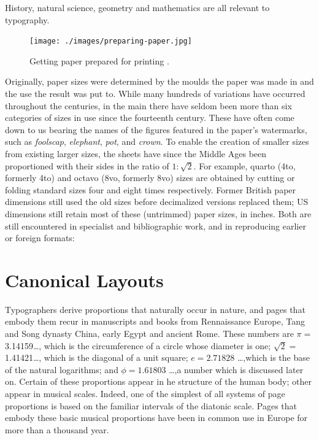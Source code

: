 History, natural science, geometry and mathematics are all relevant to typography.


\begin{figure}[ht]
\centering
\texttt{[image: ./images/preparing-paper.jpg]}
\caption{Getting paper prepared for printing \protect\cite{moxon}.}
\end{figure}

Originally, paper sizes were determined by the moulds the paper was
made in and the use the result was put to. While many hundreds of variations have occurred throughout the centuries, in the main there have seldom been more than six categories of sizes in use since the fourteenth century. These have often come down to us bearing the names of the figures featured in the paper's watermarks, such as \emph{foolscap},
\emph{elephant}, \emph{pot}, and \emph{crown}. To enable the creation of smaller sizes from
existing larger sizes, the sheets have since the Middle Ages been proportioned
with their sides in the ratio of \(1:\sqrt{2}\). For example, quarto (4to,
formerly 4to) and octavo (8vo, formerly 8vo) sizes are obtained by cutting
or folding standard sizes four and eight times respectively.
Former British paper dimensions still used the old sizes before decimalized
versions replaced them; US dimensions still retain most of these
(untrimmed) paper sizes, in inches. Both are still encountered in specialist and bibliographic work, and in reproducing earlier or foreign formats:


\section{Canonical Layouts}

Typographers derive proportions that naturally occur in nature, and pages that embody
them recur in manuscripts and books from Rennaissance Europe, Tang and Song dynasty
China, early Egypt and ancient Rome.  
These numbers are $\pi=$3.14159\ldots , which is the circumference of a circle whose diameter
is one; $\sqrt{2}=$1.41421\ldots , which is the diagonal of a unit square; 
$e=2.71828$  \ldots ,which is the base of the natural logarithms; and $\phi=1.61803$ \ldots ,a number which is discussed later on. Certain of these proportions appear in he structure of the human body; other appear in musical scales. Indeed, one of the simplest of all systems of 
page proportions is based on the familiar intervals of the diatonic scale. Pages that
embody these basic musical proportions have been in common use in Europe for more than a thousand year.

